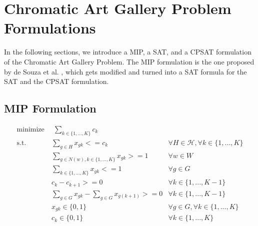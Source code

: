 \chapter{Chromatic Art Gallery Problem Formulations}

In the following sections, we introduce a MIP, a SAT, and a CPSAT formulation of the Chromatic Art Gallery Problem. The MIP formulation is the one proposed by de Souza et al. \cite{zambon2014exact}, which gets modified and turned into a SAT formula for the SAT and the CPSAT formulation.

\section{MIP Formulation}

\begin{align}
\label{eq_MIP:f.0} \mbox{minimize}~& \;\sum_{k\in \{1,...,K\}} c_{k}& \\
\label{eq_MIP:f.1} \mbox{s.t. } &\sum_{g \in H}x_{gk} <= c_{k} & \forall H \in \mathcal{H}, \forall k\in \{1,...,K\}\\
\label{eq_MIP:f.2}&\sum_{g\in N(w), k\in \{1,...,K\}}x_{gk}>=1 & \forall w\in W\\
\label{eq_MIP:f.3}&\sum_{k\in \{1,...,K\}}x_{gk}<=1 & \forall g\in G\\
\label{eq_MIP:f.4}&c_{k} - c_{k+1} >= 0 & \forall k\in \{1,...,K-1\}\\
\label{eq_MIP:f.5}&\sum_{g\in G}x_{gk} - \sum_{g\in G}x_{g(k+1)} >= 0 & \forall k\in \{1,...,K-1\}\\
\label{eq_MIP:f.6}& x_{gk} \in \{0,1\} & \forall g\in G, \forall k\in \{1,...,K\}\\
\label{eq_MIP:f.7}& c_{k}\in \{0,1\} & \forall k\in \{1,...,K\}
\end{align}


